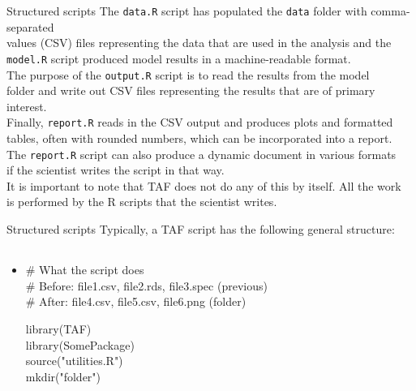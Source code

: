 \documentclass[aspectratio=169]{beamer}
\begin{document}

\begin{frame}{Structured scripts}\small
  The {\tt\darkblue data.R} script has populated the {\tt data} folder with
  comma-separated\\
  values (CSV) files representing the
  {\green data that are used in the analysis} and the\\
  {\tt model.R} script produced model results in a machine-readable
  format.\\[3ex]

  The purpose of the {\tt\darkblue output.R} script is to
  {\green read the results} from the model\\
  folder and write out CSV files representing the results that are of primary
  interest.\\[3ex]

  Finally, {\tt\darkblue report.R} reads in the CSV output and produces
  {\green plots and formatted\\
    tables}, often with rounded numbers, which can be incorporated into a
  report.\\[3ex]

  The {\tt\darkblue report.R} script can also produce a
  {\green dynamic document} in various formats\\
  if the scientist writes the script in that way.\\[3ex]

  It is important to note that TAF does not do any of this by itself. All the work\\
  is performed by the R scripts that the scientist writes.\\[3ex]
\end{frame}


\begin{frame}{Structured scripts}\small
  Typically, a TAF script has the following general structure:\\[3ex]\tt\fns
  \begin{itemize}\item[]
    \begin{gray}
      \# What the script does\\[1em]
      \# Before: file1.csv, file2.rds, file3.spec (previous)\\
      \# After:  file4.csv, file5.csv, file6.png (folder)\\[1em]
    \end{gray}
    {\blue library}(TAF)\\
    {\blue library}(SomePackage)\\
    {\blue source}("utilities.R")\\[1em]
    {\blue mkdir}("folder")\\[3ex]
  \end{itemize}
\end{frame}
\end{document}

